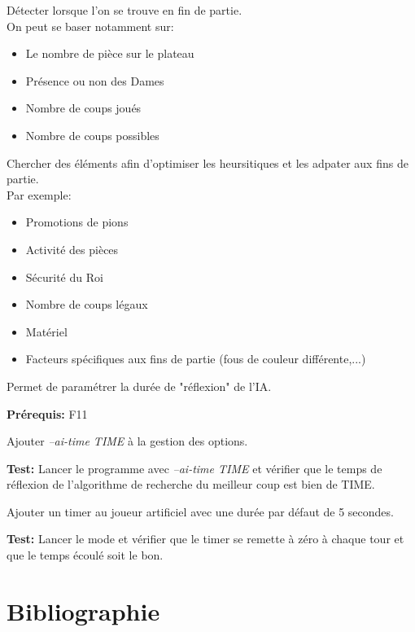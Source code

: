\documentclass{article}
\begin{document}
\begin{needbox}
    \begin{subneedbox}
        Détecter lorsque l'on se trouve en fin de partie.\\
        On peut se baser notamment sur:
        \begin{itemize}
            \item Le nombre de pièce sur le plateau
            \item Présence ou non des Dames 
            \item Nombre de coups joués 
            \item Nombre de coups possibles
        \end{itemize}
    \end{subneedbox}
    \begin{subneedbox}
        Chercher des éléments afin d'optimiser les heursitiques et les adpater aux fins de partie.\\
        Par exemple:
        \begin{itemize}
            \item Promotions de pions
            \item Activité des pièces
            \item Sécurité du Roi
            \item Nombre de coups légaux
            \item Matériel
            \item Facteurs spécifiques aux fins de partie (fous de couleur différente,...)
        \end{itemize}
    \end{subneedbox}
\end{needbox}

\begin{needbox}
    Permet de paramétrer la durée de "réflexion" de l'IA.

    \textbf{Prérequis:} F11
    \begin{subneedbox}
        Ajouter \textit{--ai-time TIME} à la gestion des options.

        \textbf{Test:} Lancer le programme avec \textit{--ai-time TIME} et vérifier que
        le temps de réflexion de l'algorithme de recherche du meilleur coup est bien de TIME.
    \end{subneedbox}
    \begin{subneedbox}
        Ajouter un timer au joueur artificiel avec une durée par défaut de 5 secondes.

        \textbf{Test:} Lancer le mode et vérifier que le timer se remette à zéro à chaque tour et que le temps écoulé soit le bon.
    \end{subneedbox}
\end{needbox}


\pagebreak
\section{Bibliographie}


\end{document}
